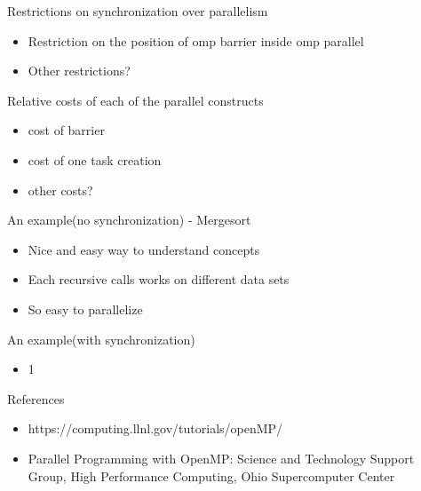 \documentclass[14pt]{beamer}
\begin{document}
\begin{frame}{Restrictions on synchronization over parallelism}
\begin{itemize}
\item Restriction on the position of omp barrier inside omp parallel
\item Other restrictions?
\end{itemize}
\end{frame}

\begin{frame}{Relative costs of each of the parallel constructs}
\begin{itemize}
\item cost of barrier
\item cost of one task creation
\item other costs?
\end{itemize}
\end{frame}

\begin{frame}{An example(no synchronization) - Mergesort}
\begin{itemize}
\item Nice and easy way to understand concepts
\item Each recursive calls works on different data sets
\item So easy to parallelize
\end{itemize}
\end{frame}

\begin{frame}{An example(with synchronization)}
\begin{itemize}
\item 1
\end{itemize}
\end{frame}

\begin{frame}{References}
\begin{itemize}
\item https://computing.llnl.gov/tutorials/openMP/
\item Parallel Programming with OpenMP: Science and Technology Support Group, High Performance Computing, Ohio Supercomputer Center
\end{itemize}
\end{frame}
\end{document}
